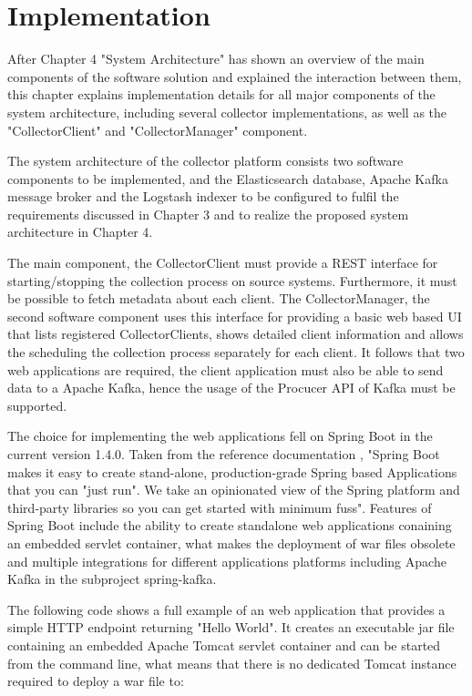 \chapter{Implementation}

After Chapter 4 "System Architecture" has shown an overview of the main components of
the software solution and explained the interaction between them, this chapter explains implementation
details for all major components of the system architecture, including several
collector implementations, as well as the "CollectorClient" and "CollectorManager" component.

The system architecture of the collector platform consists two software components to
be implemented, and the Elasticsearch database, Apache Kafka message broker and the Logstash
indexer to be configured to fulfil the requirements discussed in Chapter 3 and to realize the proposed system architecture in Chapter 4.

The main component, the CollectorClient must provide a REST interface for starting/stopping the collection process
on source systems. Furthermore, it must be possible to fetch metadata about each client. The CollectorManager,
the second software component uses this interface for providing a basic web based UI that lists registered
CollectorClients, shows detailed client information and allows the scheduling the collection process separately
for each client. It follows that two web applications are required, the client application must also be able to
send data to a Apache Kafka, hence the usage of the Procucer API of Kafka must be supported.

The choice for implementing the web applications fell on Spring Boot in the current version 1.4.0. Taken from
the reference documentation \cite{SpringB16}, "Spring Boot makes it easy to create stand-alone, production-grade
Spring based Applications that you can "just run". We take an opinionated view of the Spring platform and
third-party libraries so you can get started with minimum fuss". Features of Spring Boot include the ability to create
standalone web applications conaining an embedded servlet container, what makes the deployment of war files obsolete
and multiple integrations for different applications platforms including Apache Kafka in the subproject spring-kafka.

The following code shows a full example of an web application that provides a simple
HTTP endpoint returning "Hello World". It creates an executable jar file containing
an embedded Apache Tomcat servlet container and can be started from the command line, what means that there is no
dedicated Tomcat instance required to deploy a war file to:

